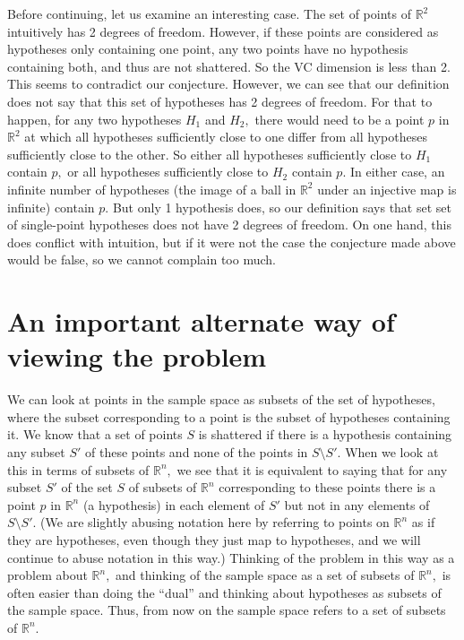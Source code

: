 \documentclass[12pt]{amsart}
\newcommand{\0}{\mat{0}}
\newcommand{\1}{\mathds{1}}
\begin{document}
Before continuing, let us examine an interesting case. The set of points of $\mathbb{R}^2$ intuitively has 2 degrees of freedom. However, if these points are considered as hypotheses only containing one point, any two points have no hypothesis containing both, and thus are not shattered. So the VC dimension is less than 2. This seems to contradict our conjecture. However, we can see that our definition does not say that this set of hypotheses has 2 degrees of freedom. For that to happen, for any two hypotheses $H_1$ and $H_2,$ there would need to be a point $p$ in $\mathbb{R}^2$ at which all hypotheses sufficiently close to one differ from all hypotheses sufficiently close to the other. So either all hypotheses sufficiently close to $H_1$ contain $p,$ or all hypotheses sufficiently close to $H_2$ contain $p.$ In either case, an infinite number of hypotheses (the image of a ball in $\mathbb{R}^2$ under an injective map is infinite) contain $p.$ But only 1 hypothesis does, so our definition says that set set of single-point hypotheses does not have 2 degrees of freedom. On one hand, this does conflict with intuition, but if it were not the case the conjecture made above would be false, so we cannot complain too much.

\section{An important alternate way of viewing the problem}

We can look at points in the sample space as subsets of the set of hypotheses, where the subset corresponding to a point is the subset of hypotheses containing it. We know that a set of points $S$ is shattered if there is a hypothesis containing any subset $S'$ of these points and none of the points in $S \setminus S'.$ When we look at this in terms of subsets of $\mathbb{R}^n,$ we see that it is equivalent to saying that for any subset $S'$ of the set $S$ of subsets of $\mathbb{R}^n$ corresponding to these points there is a point $p$ in $\mathbb{R}^n$ (a hypothesis) in each element of $S'$ but not in any elements of $S \setminus S'.$ (We are slightly abusing notation here by referring to points on $\mathbb{R}^n$ as if they are hypotheses, even though they just map to hypotheses, and we will continue to abuse notation in this way.) Thinking of the problem in this way as a problem about $\mathbb{R}^n,$ and thinking of the sample space as a set of subsets of $\mathbb{R}^n,$ is often easier than doing the ``dual'' and thinking about hypotheses as subsets of the sample space. Thus, from now on the sample space refers to a set of subsets of $\mathbb{R}^n.$
\end{document}
